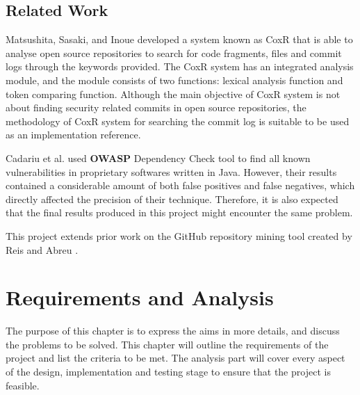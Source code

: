 \documentclass[12pt, a4paper]{report}
\begin{document}
\section{Related Work}
Matsushita, Sasaki, and Inoue \cite{matsushita_2005} developed a system known as CoxR that is able
to analyse open source repositories to search for code fragments, files and commit logs through the
keywords provided. The CoxR system has an integrated analysis module, and the module consists of two
functions: lexical analysis function and token comparing function. Although the main objective of
CoxR system is not about finding security related commits in open source repositories, the
methodology of CoxR system for searching the commit log is suitable to be used as an implementation
reference.

Cadariu et al. \cite{cadariu_2015} used \textbf{OWASP} Dependency Check tool \cite{owasp_dependency}
to find all known vulnerabilities in proprietary softwares written in Java. However, their results
contained a considerable amount of both false positives and false negatives, which directly affected
the precision of their technique. Therefore, it is also expected that the final results produced in
this project might encounter the same problem.

This project extends prior work on the GitHub repository mining tool created by Reis and Abreu
\cite{secbench}.



\chapter{Requirements and Analysis}
The purpose of this chapter is to express the aims in more details, and discuss the problems to be
solved. This chapter will outline the requirements of the project and list the criteria to be met.
The analysis part will cover every aspect of the design, implementation and testing stage to ensure
that the project is feasible.
\end{document}
